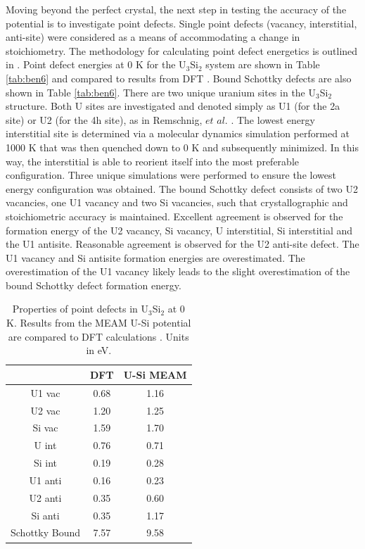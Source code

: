 \documentclass[review]{elsarticle}
\begin{document}
\FloatBarrier

Moving beyond the perfect crystal, the next step in testing the accuracy of the potential is to investigate point defects.  Single point defects (vacancy, interstitial, anti-site) were considered as a means of accommodating a change in stoichiometry.  The methodology for calculating point defect energetics is outlined in \cite{middleburgh2016}.  Point defect energies at 0 K for the U$_{3}$Si$_{2}$ system are shown in Table \ref{tab:ben6} and compared to results from DFT \cite{middleburgh2016}.  Bound Schottky defects are also shown in Table \ref{tab:ben6}.  There are two unique uranium sites in the U$_{3}$Si$_{2}$ structure.  Both U sites are investigated and denoted simply as U1 (for the 2a site) or U2 (for the 4h site), as in Remschnig, $\textit{et al.}$ \cite{remschnig1992}.  The lowest energy interstitial site is determined via a molecular dynamics simulation performed at 1000 K that was then quenched down to 0 K and subsequently minimized.   In this way, the interstitial is able to reorient itself into the most preferable configuration.  Three unique simulations were performed to ensure the lowest energy configuration was obtained.  The bound Schottky defect consists of two U2 vacancies, one U1 vacancy and two Si vacancies, such that crystallographic and stoichiometric accuracy is maintained.  Excellent agreement is observed for the formation energy of the U2 vacancy, Si vacancy, U interstitial, Si interstitial and the U1 antisite.  Reasonable agreement is observed for the U2 anti-site defect.  The U1 vacancy and Si antisite formation energies are overestimated.  The overestimation of the U1 vacancy likely leads to the slight overestimation of the bound Schottky defect formation energy.  

\begin{table}[h!]
\caption{Properties of point defects in U$_{3}$Si$_{2}$ at 0 K.  Results from the MEAM U-Si potential are compared to DFT calculations \cite{middleburgh2016}.  Units in eV.}\label{tab:ben6}
\begin{center}
\begin{tabular}{|c|c|c|}
     \hline
      &  DFT & U-Si MEAM \\
     \hline
     U1 vac & 0.68 & 1.16 \\
     U2 vac & 1.20 & 1.25 \\
     Si vac & 1.59 & 1.70 \\
     U int & 0.76 & 0.71 \\
     Si int & 0.19 & 0.28 \\
     U1 anti & 0.16 & 0.23 \\
     U2 anti & 0.35 & 0.60 \\
     Si anti & 0.35 & 1.17 \\
     Schottky Bound & 7.57 & 9.58  \\
     \hline
\end{tabular}
\end{center}
\label{default}
\end{table}%
\end{document}
